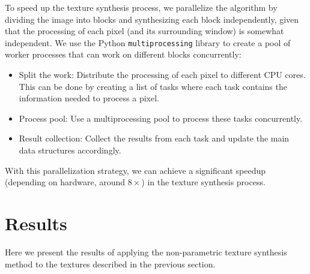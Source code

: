 \documentclass{article}
\begin{document}
To speed up the texture synthesis process, we parallelize the algorithm by dividing the image into blocks and synthesizing each block independently, given that the processing of each pixel (and its surrounding window) is somewhat independent.
We use the Python \texttt{multiprocessing} library to create a pool of worker processes that can work on different blocks concurrently:
\begin{itemize}
    \item {Split the work:} Distribute the processing of each pixel to different CPU cores. This can be done by creating a list of tasks where each task contains the information needed to process a pixel.
    \item {Process pool:} Use a multiprocessing pool to process these tasks concurrently.
    \item {Result collection:} Collect the results from each task and update the main data structures accordingly.
\end{itemize}
With this parallelization strategy, we can achieve a significant speedup (depending on hardware, around $8\times$) in the texture synthesis process.

\section{Results}

Here we present the results of applying the non-parametric texture synthesis method to the textures described in the previous section.
\end{document}
